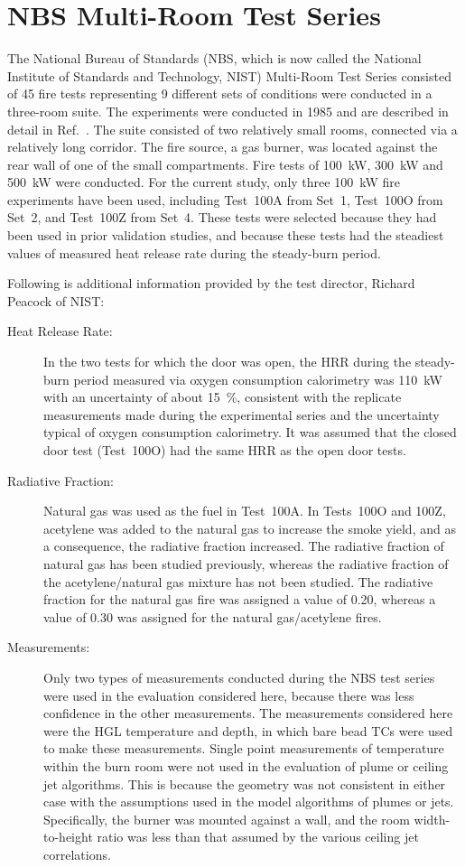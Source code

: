 \clearpage

\section{NBS Multi-Room Test Series}

The National Bureau of Standards (NBS, which is now called the National Institute of Standards
and Technology, NIST) Multi-Room Test Series consisted of 45 fire tests representing
9 different sets of conditions were conducted in a three-room suite. The experiments were
conducted in 1985 and are described in detail in Ref.~\cite{Peacock:NBS_Multi-Room}. The suite consisted of two relatively
small rooms, connected via a relatively long corridor. The fire source, a gas burner, was located
against the rear wall of one of the small compartments.
Fire tests of 100~kW, 300~kW and 500~kW were conducted. For the current study, only three 100~kW fire experiments have been used,
including Test~100A from Set~1, Test~100O from Set~2, and Test~100Z from Set~4. These tests
were selected because they had been used in prior validation studies, and because these tests had the
steadiest values of measured heat release rate during the steady-burn period.

Following is additional information provided by the test director, Richard Peacock of NIST:
\begin{description}
\item[Heat Release Rate:] In the two tests for which
the door was open, the HRR during the steady-burn period measured via oxygen consumption
calorimetry was 110~kW with an uncertainty of about 15~\%, consistent with the replicate
measurements made during the experimental series and the uncertainty typical of oxygen
consumption calorimetry. It was assumed that the closed door test (Test~100O) had the same HRR as the open
door tests.
\item[Radiative Fraction:] Natural gas was used as the fuel in
Test~100A. In Tests~100O and 100Z, acetylene was added to the natural gas to increase the
smoke yield, and as a consequence, the radiative fraction increased. The radiative fraction of
natural gas has been studied previously, whereas the radiative fraction of the acetylene/natural
gas mixture has not been studied. The radiative fraction for the natural gas fire was assigned a
value of 0.20, whereas a value of 0.30 was assigned for the natural gas/acetylene fires.
\item[Measurements:] Only two types of measurements conducted during the NBS test series were used in the
evaluation considered here, because there was less confidence in the other measurements.
The measurements considered here were the HGL temperature and depth, in which bare bead
TCs were used to make these measurements. Single point measurements of temperature within
the burn room were not used in the evaluation of plume or ceiling jet algorithms. This is because
the geometry was not consistent in either case with the assumptions used in the model algorithms
of plumes or jets. Specifically, the burner was mounted against a wall, and the room width-to-height
ratio was less than that assumed by the various ceiling jet correlations.
\end{description}

